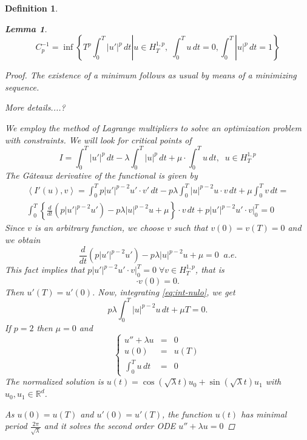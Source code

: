 \documentclass[twoside]{article}
\newtheorem{lem}[thm]{Lemma}
\newtheorem{defi}[thm]{Definition}
\theoremstyle{remark}
\newcommand{\rr}{\mathbb{R}}
\begin{document}
\begin{defi}
\begin{lem}
\begin{equation}
C_p^{-1}=\inf \left\{T^p \int_0^T |u'|^p\,dt | u\in H^{1,p}_T,\;\int_0^T u\,dt=0, 
\int_0^T |u|^p\,dt=1\right\}
\end{equation}
\end{lem}
\begin{proof}
The existence of a minimum follows as usual by means of a minimizing sequence. 

More details....?

We employ the method of Lagrange multipliers to solve an optimization problem with constraints. 
We will look for critical points of 
\begin{equation}
I=\int_0^T |u'|^p\,dt-\lambda \int_0^T |u|^p\,dt+\mu \cdot \int_0^T u\,dt,\;\; u\in H^{1,p}_T 
\end{equation}
The G\^ateaux derivative of the functional is given by
\begin{equation}
\begin{split}
\left\langle I'(u),v\right\rangle=
\int_0^T p |u'|^{p-2}u'\cdot v'\,dt-p\lambda \int_0^T |u|^{p-2}u\cdot v\,dt+ \mu \int_0^T v\,dt=
\\
\int_0^T \left\{\frac{d}{dt}(p |u'|^{p-2}u')-p\lambda |u|^{p-2}u+\mu\right\}\cdot v\,dt+p |u'|^{p-2}u'\cdot v|_0^T=0
\end{split}
\end{equation}
Since $v$ is an arbitrary function, we choose $v$ such that $v(0)=v(T)=0$ and we obtain 
\begin{equation}\label{eq:int-nulo}
\frac{d}{dt}(p |u'|^{p-2}u')-p\lambda |u|^{p-2}u+\mu=0 \;\;a.e.
\end{equation}
This fact implies that 
$p |u'|^{p-2}u'\cdot v|_0^T=0 \; \forall v \in H^{1,p}_T$, that is
 \begin{equation}
[p |u'(T)|^{p-2}u'(T)-p|u'(0)|^{p-2}u'(0)]\cdot v(0)=0.
\end{equation}
Then $u'(T)=u'(0)$. 
Now, integrating \eqref{eq:int-nulo}, we get
\[
p\lambda \int_0^T |u|^{p-2}u\,dt+\mu T=0.
\]
If $p=2$ then $\mu=0$ and 
\[
\left\{
\begin{array}{lll}
u''+ \lambda u&=&0\\
u(0)&=&u(T)\\
\int_0^T u\,dt&=&0
\end{array}
\right.
\]
The normalized solution is
$u(t)=\cos(\sqrt\lambda t)u_0+\sin(\sqrt\lambda t)u_1$
with $u_0,u_1\in \rr^d$.

As $u(0)=u(T)$ and $u'(0)=u'(T)$, 
the function $u(t)$ has minimal  period $\frac{2\pi}{\sqrt \lambda}$ and it solves the second order ODE 
$u''+ \lambda u=0$


\end{proof}
\end{defi}
\end{document}
